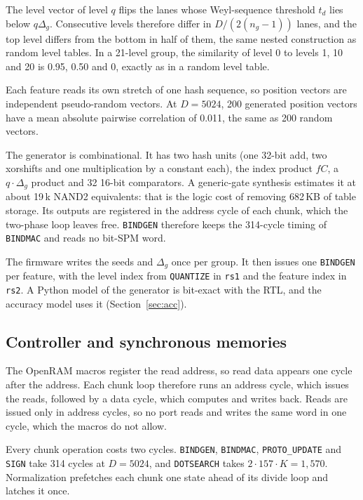 \documentclass[conference]{IEEEtran}
\begin{document}
The level vector of level $q$ flips the lanes whose Weyl-sequence threshold $t_d$ lies below $q\Delta_g$. Consecutive levels therefore differ in $D/(2(n_g{-}1))$ lanes, and the top level differs from the bottom in half of them, the same nested construction as random level tables. In a 21-level group, the similarity of level 0 to levels 1, 10 and 20 is 0.95, 0.50 and 0, exactly as in a random level table.

Each feature reads its own stretch of one hash sequence, so position vectors are independent pseudo-random vectors. At $D{=}5024$, 200 generated position vectors have a mean absolute pairwise correlation of 0.011, the same as 200 random vectors.

The generator is combinational. It has two hash units (one 32-bit add, two xorshifts and one multiplication by a constant each), the index product $fC$, a $q\cdot\Delta_g$ product and 32 16-bit comparators. A generic-gate synthesis estimates it at about 19\,k NAND2 equivalents: that is the logic cost of removing 682\,KB of table storage. Its outputs are registered in the address cycle of each chunk, which the two-phase loop leaves free. \texttt{BINDGEN} therefore keeps the 314-cycle timing of \texttt{BINDMAC} and reads no bit-SPM word.

The firmware writes the seeds and $\Delta_g$ once per group. It then issues one \texttt{BINDGEN} per feature, with the level index from \texttt{QUANTIZE} in \texttt{rs1} and the feature index in \texttt{rs2}. A Python model of the generator is bit-exact with the RTL, and the accuracy model uses it (Section~\ref{sec:acc}).

\subsection{Controller and synchronous memories}
\label{sec:ctrl}
The OpenRAM macros register the read address, so read data appears one cycle after the address. Each chunk loop therefore runs an address cycle, which issues the reads, followed by a data cycle, which computes and writes back. Reads are issued only in address cycles, so no port reads and writes the same word in one cycle, which the macros do not allow.

Every chunk operation costs two cycles. \texttt{BINDGEN}, \texttt{BINDMAC}, \texttt{PROTO\_UPDATE} and \texttt{SIGN} take 314 cycles at $D{=}5024$, and \texttt{DOTSEARCH} takes $2\cdot157\cdot K=1{,}570$. Normalization prefetches each chunk one state ahead of its divide loop and latches it once.
\end{document}
